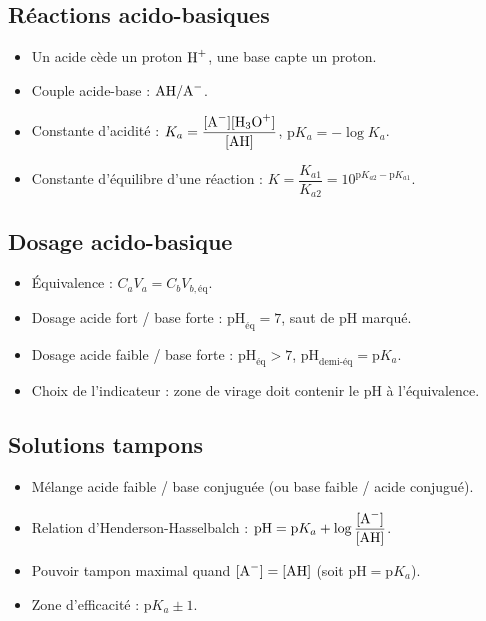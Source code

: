 \begin{synthese}
\subsection*{Réactions acido-basiques}
\begin{itemize}
    \item Un acide cède un proton $\ce{H+}$, une base capte un proton.
    \item Couple acide-base : $\ce{AH/A-}$.
    \item Constante d'acidité : $K_a = \dfrac{[\ce{A-}][\ce{H3O+}]}{[\ce{AH}]}$, $\mathrm{p}K_a = -\log K_a$.
    \item Constante d'équilibre d'une réaction : $K = \dfrac{K_{a1}}{K_{a2}} = 10^{\mathrm{p}K_{a2} - \mathrm{p}K_{a1}}$.
\end{itemize}

\subsection*{Dosage acido-basique}
\begin{itemize}
    \item Équivalence : $C_a V_a = C_b V_{b,\text{éq}}$.
    \item Dosage acide fort / base forte : $\mathrm{pH}_{\text{éq}} = 7$, saut de pH marqué.
    \item Dosage acide faible / base forte : $\mathrm{pH}_{\text{éq}} > 7$, $\mathrm{pH}_{\text{demi-éq}} = \mathrm{p}K_a$.
    \item Choix de l'indicateur : zone de virage doit contenir le pH à l'équivalence.
\end{itemize}

\subsection*{Solutions tampons}
\begin{itemize}
    \item Mélange acide faible / base conjuguée (ou base faible / acide conjugué).
    \item Relation d'Henderson-Hasselbalch : $\mathrm{pH} = \mathrm{p}K_a + \log\dfrac{[\ce{A-}]}{[\ce{AH}]}$.
    \item Pouvoir tampon maximal quand $[\ce{A-}] = [\ce{AH}]$ (soit $\mathrm{pH} = \mathrm{p}K_a$).
    \item Zone d'efficacité : $\mathrm{p}K_a \pm 1$.
\end{itemize}


\end{synthese}
